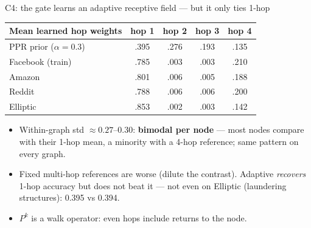 \documentclass[aspectratio=169,11pt]{beamer}
\begin{document}
\begin{frame}{C4: the gate learns an adaptive receptive field --- but it only ties 1-hop}
\centering\small
\begin{tabular}{lcccc}
\toprule
Mean learned hop weights & hop 1 & hop 2 & hop 3 & hop 4\\ \midrule
PPR prior ($\alpha=0.3$) & .395 & .276 & .193 & .135\\
Facebook (train) & .785 & .003 & .003 & .210\\
Amazon & .801 & .006 & .005 & .188\\
Reddit & .788 & .006 & .006 & .200\\
Elliptic & .853 & .002 & .003 & .142\\ \bottomrule
\end{tabular}
\vspace{6pt}
\begin{itemize}\footnotesize
\item Within-graph std $\approx0.27$--$0.30$: \textbf{bimodal per node} --- most nodes compare with their 1-hop mean, a minority with a 4-hop reference; same pattern on every graph.
\item Fixed multi-hop references are \textcolor{bad}{worse} (dilute the contrast). Adaptive \emph{recovers} 1-hop accuracy but does not beat it --- \alert{not even on Elliptic} (laundering structures): 0.395 vs 0.394.
\item $P^k$ is a walk operator: even hops include returns to the node.
\end{itemize}
\end{frame}
\end{document}
